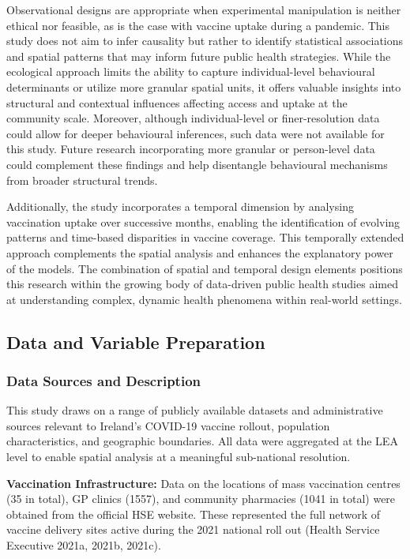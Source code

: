 \documentclass{article}
\begin{document}
Observational designs are appropriate when experimental manipulation is
neither ethical nor feasible, as is the case with vaccine uptake during
a pandemic. This study does not aim to infer causality but rather to
identify statistical associations and spatial patterns that may inform
future public health strategies. While the ecological approach limits
the ability to capture individual-level behavioural determinants or
utilize more granular spatial units, it offers valuable insights into
structural and contextual influences affecting access and uptake at the
community scale. Moreover, although individual-level or finer-resolution
data could allow for deeper behavioural inferences, such data were not
available for this study. Future research incorporating more granular or
person-level data could complement these findings and help disentangle
behavioural mechanisms from broader structural trends.

Additionally, the study incorporates a temporal dimension by analysing
vaccination uptake over successive months, enabling the identification
of evolving patterns and time-based disparities in vaccine coverage.
This temporally extended approach complements the spatial analysis and
enhances the explanatory power of the models. The combination of spatial
and temporal design elements positions this research within the growing
body of data-driven public health studies aimed at understanding
complex, dynamic health phenomena within real-world settings.

\subsection{Data and Variable
Preparation}\label{data-and-variable-preparation}

\subsubsection{Data Sources and
Description}\label{data-sources-and-description}

This study draws on a range of publicly available datasets and
administrative sources relevant to Ireland's COVID-19 vaccine rollout,
population characteristics, and geographic boundaries. All data were
aggregated at the LEA level to enable spatial analysis at a meaningful
sub-national resolution.

\textbf{Vaccination Infrastructure:} Data on the locations of mass
vaccination centres (35 in total), GP clinics (1557), and community
pharmacies (1041 in total) were obtained from the official HSE website.
These represented the full network of vaccine delivery sites active
during the 2021 national roll out (Health Service Executive 2021a,
2021b, 2021c).
\end{document}
